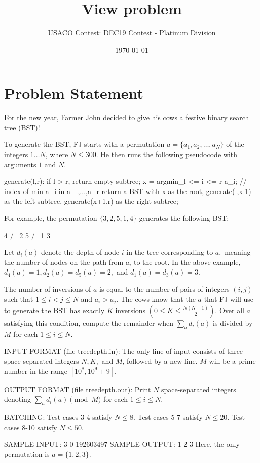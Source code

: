 \documentclass[12pt]{article}
\title{View problem}
\author{USACO Contest: DEC19 Contest - Platinum Division}
\date{\today}
\begin{document}
\maketitle

\section*{Problem Statement}

For the new year, Farmer John decided to give his cows a festive binary search tree
(BST)! 

To generate the BST, FJ starts with a permutation $a=\{a_1,a_2,\ldots,a_N\}$
of the integers $1\ldots N$, where $N\le 300$.  He then runs the following
pseudocode with arguments $1$ and $N.$


generate(l,r):
  if l > r, return empty subtree;
  x = argmin_{l <= i <= r} a_i; // index of min a_i in {a_l,...,a_r}
  return a BST with x as the root, 
    generate(l,x-1) as the left subtree,
    generate(x+1,r) as the right subtree;

For example, the permutation $\{3,2,5,1,4\}$ generates the following BST:


    4
   / \
  2   5
 / \ 
1   3

Let $d_i(a)$ denote the depth of node $i$ in the tree corresponding to $a,$ 
meaning the number of nodes on the path from $a_i$ to the root. In the above
example, $d_4(a)=1, d_2(a)=d_5(a)=2,$ and $d_1(a)=d_3(a)=3.$

The number of inversions of $a$ is equal to the number of pairs of integers
$(i,j)$ such that $1\le i<j\le N$ and $a_i>a_j.$ The cows know that the $a$ that
FJ will use to generate the BST has exactly $K$ inversions
$(0\le K\le \frac{N(N-1)}{2})$.  Over all $a$ satisfying this condition, compute
the remainder when $\sum_ad_i(a)$ is divided by $M$ for each $1\le i\le N.$

INPUT FORMAT (file treedepth.in):
The only line of input consists of three space-separated integers $N, K,$ and
$M$, followed by a new line. $M$ will be a prime number in the range
$[10^8,10^9+9].$

OUTPUT FORMAT (file treedepth.out):
Print $N$ space-separated integers denoting $\sum_ad_i(a)\pmod{M}$ for each 
$1\le i\le N.$

BATCHING:
Test cases 3-4 satisfy $N\le 8.$ Test cases 5-7 satisfy $N\le 20.$ Test cases 8-10 satisfy $N\le 50.$ 

SAMPLE INPUT:
3 0 192603497
SAMPLE OUTPUT: 
1 2 3 
Here, the only permutation is $a=\{1,2,3\}.$ 
\end{document}
